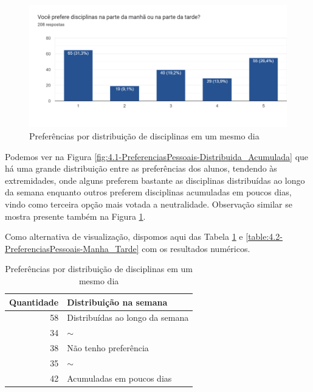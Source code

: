         \begin{figure}[htbp]\centering
            \caption{\label{fig:4.2-PreferenciasPessoais-Manha_Tarde}Preferências por distribuição de disciplinas em um mesmo dia}
            \includegraphics[scale=0.6]{files/img/Forms/4.2-PreferenciasPessoais-Manha_Tarde.png}
        \end{figure} %

        Podemos ver na Figura \ref{fig:4.1-PreferenciasPessoais-Distribuida_Acumulada} que há uma grande distribuição entre as preferências dos alunos, tendendo às extremidades, onde alguns preferem bastante as disciplinas distribuídas ao longo da semana enquanto outros preferem disciplinas acumuladas em poucos dias, vindo como terceira opção mais votada a neutralidade. Observação similar se mostra presente também na Figura \ref{fig:4.2-PreferenciasPessoais-Manha_Tarde}.

        Como alternativa de visualização, dispomos aqui das Tabela \ref{table:4.1-PreferenciasPessoais-Distribuída_Acumulada} e \ref{table:4.2-PreferenciasPessoais-Manha_Tarde} com os resultados numéricos.

        \begin{table}[htbp]
            \centering
            \caption{\label{table:4.1-PreferenciasPessoais-Distribuída_Acumulada}Preferências por distribuição de disciplinas em um mesmo dia}
            \begin{tabular}{| r l |}
                \hline
                    \textbf{Quantidade} & \textbf{Distribuição na semana} \\
                \hline
                    58 & Distribuídas ao longo da semana \\
                    34 & $\sim$                          \\
                    38 & Não tenho preferência           \\
                    35 & $\sim$                          \\
                    42 & Acumuladas em poucos dias       \\
                \hline
            \end{tabular}
        \end{table}

